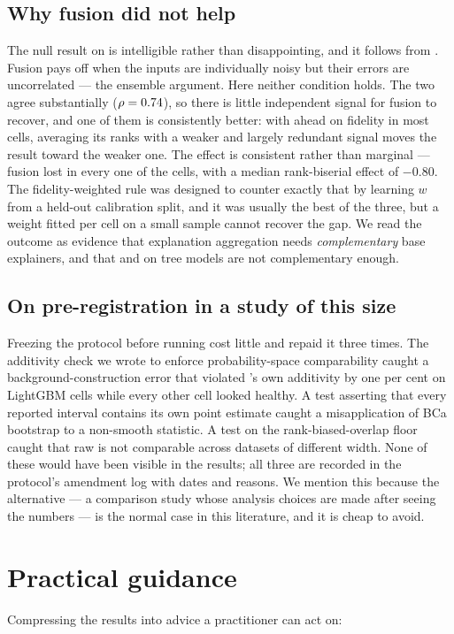 \subsection{Why fusion did not help}
The null result on  is intelligible rather than disappointing, and it follows
from . Fusion pays off when the inputs are individually noisy but their errors
are uncorrelated --- the ensemble argument. Here neither condition holds. The two agree
substantially ($\rho = 0.74{}$), so there is little independent signal for fusion
to recover, and one of them is consistently better: with \shap{} ahead on fidelity in
most cells, averaging its ranks with a weaker and largely redundant signal moves the
result toward the weaker one. The effect is consistent rather than marginal --- fusion
lost in every one of the \HSixTotal{} cells, with a median rank-biserial effect of
$-0.80$. The fidelity-weighted rule was designed to counter exactly that
by learning $w$ from a held-out calibration split, and it was usually the best of the
three, but a weight fitted per cell on a small sample cannot recover the gap. We read
the outcome as evidence that explanation aggregation needs \emph{complementary} base
explainers, and that \shap{} and \lime{} on tree models are not complementary enough.

\subsection{On pre-registration in a study of this size}
Freezing the protocol before running cost little and repaid it three times. The
additivity check we wrote to enforce probability-space comparability caught a
background-construction error that violated \shap{}'s own additivity by one per cent
on LightGBM cells while every other cell looked healthy. A test asserting that every
reported interval contains its own point estimate caught a misapplication of BCa
bootstrap to a non-smooth statistic. A test on the rank-biased-overlap floor caught
that raw \rbo{} is not comparable across datasets of different width. None of these
would have been visible in the results; all three are recorded in the protocol's
amendment log with dates and reasons. We mention this because the alternative --- a
comparison study whose analysis choices are made after seeing the numbers --- is the
normal case in this literature, and it is cheap to avoid.

\section{Practical guidance}
Compressing the results into advice a practitioner can act on:

